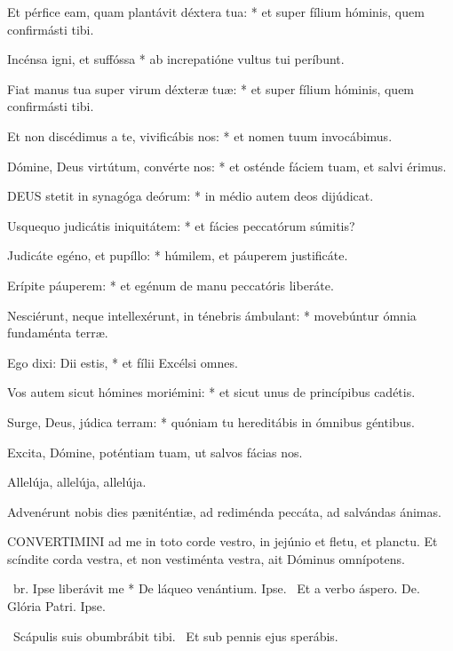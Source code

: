 Et pérfice eam, quam plantávit déxtera tua: * et super fílium hóminis, quem confirmásti tibi.

Incénsa igni, et suffóssa * ab increpatióne vultus tui períbunt.

Fiat manus tua super virum déxteræ tuæ: * et super fílium hóminis, quem confirmásti tibi.

Et non discédimus a te, vivificábis nos: * et nomen tuum invocábimus.

Dómine, Deus virtútum, convérte nos: * et osténde fáciem tuam, et salvi érimus.


\lettrine[lines=2]{D}{EUS} stetit in synagóga deórum: * in médio autem deos dijúdicat.

Usquequo judicátis iniquitátem: * et fácies peccatórum súmitis?

Judicáte egéno, et pupíllo: * húmilem, et páuperem justificáte.

Erípite páuperem: * et egénum de manu peccatóris liberáte.

Nesciérunt, neque intellexérunt, in ténebris ámbulant: * movebúntur ómnia fundaménta terræ.

Ego dixi: Dii estis, * et fílii Excélsi omnes.

Vos autem sicut hómines moriémini: * et sicut unus de princípibus cadétis.

Surge, Deus, júdica terram: * quóniam tu hereditábis in ómnibus géntibus.

  Excita, Dómine, poténtiam tuam, ut salvos fácias nos.

  Allelúja, allelúja, allelúja.



 Advenérunt nobis dies pæniténtiæ, ad rediménda peccáta, ad salvándas ánimas.


\lettrine[lines=2]{C}{ONVERTIMINI} ad me in toto corde vestro, in jejúnio et fletu, et planctu. Et scíndite corda vestra, et non vestiménta vestra, ait Dóminus omnípotens.

\R\ br. Ipse liberávit me * De láqueo venántium. Ipse. \V\ Et a verbo áspero. De. Glória Patri. Ipse.

\V\ Scápulis suis obumbrábit tibi. \R\ Et sub pennis ejus sperábis.

